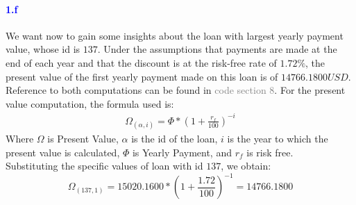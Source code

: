 \documentclass[a4paper,12pt]{article}
\begin{document}
\paragraph{\textcolor{Blue}{1.f}} We want now to gain some insights about the loan with largest yearly payment value, whose id is $137$. Under the assumptions that payments are made at the end of each year and that the discount is at the risk-free rate of $1.72\%$, the present value of the first yearly payment made on this loan is of $14766.1800 USD$. Reference to both computations can be found in \textcolor{gray}{code section 8}. For the present value computation, the formula used is:
\begin{align}\label{present value for one year}
\Omega_{(\alpha, i)} = \Phi * \left( 1 + \frac{r_f}{100} \right)^{- i}
\end{align}
Where $\Omega$ is Present Value, $\alpha$ is the id of the loan, $i$ is the year to which the present value is calculated, $\Phi$ is Yearly Payment, and $r_f$ is risk free.\\
Substituting the specific values of loan with id $137$, we obtain:
$$\Omega_{(137, 1)} = 15020.1600 * \left(1 + \frac{1.72}{100} \right)^{- 1} = 14766.1800$$
\end{document}
